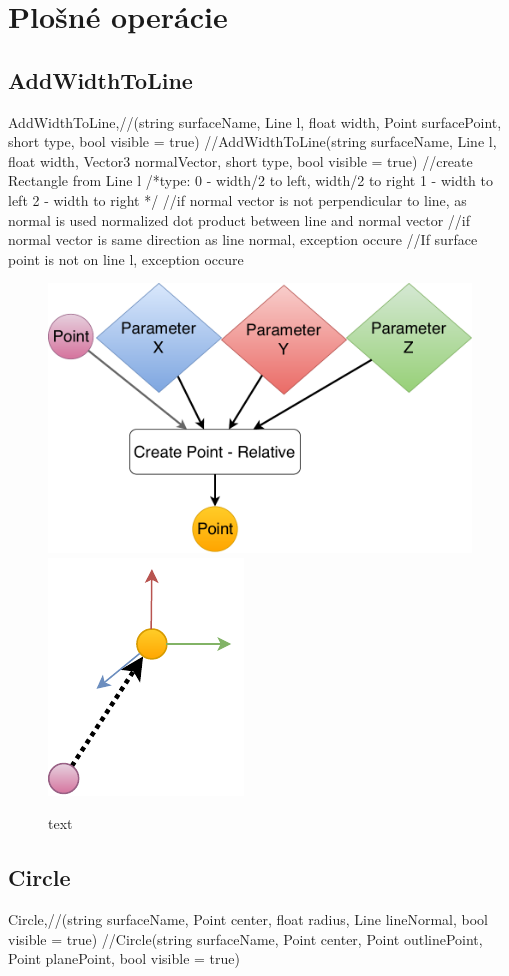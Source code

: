 \section{Plošné operácie}


\subsection{AddWidthToLine}
	AddWidthToLine,//(string surfaceName, Line l, float width, Point surfacePoint, short type, bool visible = true)
	//AddWidthToLine(string surfaceName, Line l, float width, Vector3 normalVector, short type, bool visible = true)
//create Rectangle from Line l
/*type:
	0 - width/2 to left, width/2 to right
	1 - width to left
	2 - width to right
	*/
	//if normal vector is not perpendicular to line, as normal is used normalized dot product between line and normal vector
	//if normal vector is same direction as line normal, exception occure
	//If surface point is not on line l, exception occure

\begin{figure}[H]
	\centering
	\includegraphics[height=0.3\textwidth]{obrazky-figures/Diagram/DP Navrh operacii-0D - Point2.pdf}
	\includegraphics[height=0.3\textwidth]{obrazky-figures/Diagram/Draw/1Points/DP Navrh operacii-0D - PointRelative.pdf}
	\caption{text}
	\label{fig:1}
\end{figure}

\subsection{Circle}
	Circle,//(string surfaceName, Point center, float radius, Line lineNormal, bool visible = true)
	//Circle(string surfaceName, Point center, Point outlinePoint, Point planePoint, bool visible = true)

